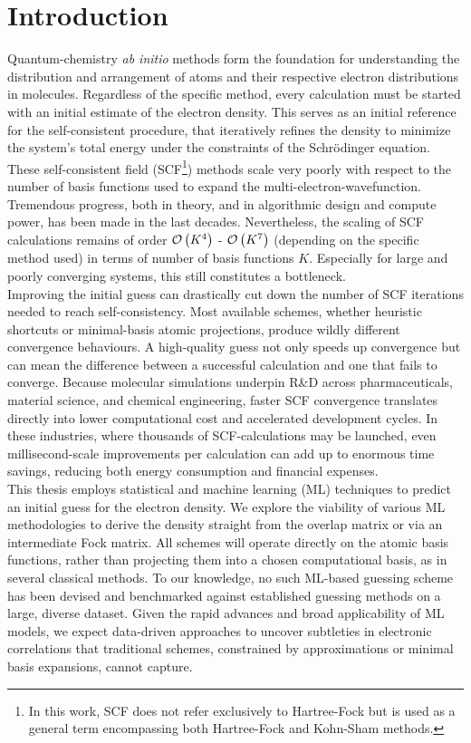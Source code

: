 \chapter{Introduction}
\label{sec:introduction}

Quantum-chemistry \textit{ab initio} methods form the foundation for understanding the distribution and arrangement of atoms and their respective electron distributions in molecules. Regardless of the specific method, every calculation must be started with an initial estimate of the electron density. This serves as an initial reference for the self-consistent procedure, that iteratively refines the density to minimize the system's total energy under the constraints of the Schrödinger equation. These self-consistent field (SCF\footnote{In this work, SCF does not refer exclusively to Hartree-Fock but is used as a general term encompassing both Hartree-Fock and Kohn-Sham methods.}) methods scale very poorly with respect to the number of basis functions used to expand the multi-electron-wavefunction. Tremendous progress, both in theory, and in algorithmic design and compute power, has been made in the last decades. Nevertheless, the scaling of SCF calculations remains of order $\mathcal{O}\left(K^4\right)$ - $\mathcal{O}\left(K^7\right)$ (depending on the specific method used) in terms of number of basis functions $K$. Especially for large and poorly converging systems, this still constitutes a bottleneck. \\

Improving the initial guess can drastically cut down the number of SCF iterations needed to reach self-consistency. Most available schemes, whether heuristic shortcuts or minimal-basis atomic projections, produce wildly different convergence behaviours. A high-quality guess not only speeds up convergence but can mean the difference between a successful calculation and one that fails to converge. Because molecular simulations underpin R\&D across pharmaceuticals, material science, and chemical engineering, faster SCF convergence translates directly into lower computational cost and accelerated development cycles. In these industries, where thousands of SCF-calculations may be launched, even millisecond-scale improvements per calculation can add up to enormous time savings, reducing both energy consumption and financial expenses. \\

This thesis employs statistical and machine learning (ML) techniques to predict an initial guess for the electron density. We explore the viability of various ML methodologies to derive the density straight from the overlap matrix or via an intermediate Fock matrix. All schemes will operate directly on the atomic basis functions, rather than projecting them into a chosen computational basis, as in several classical methods. To our knowledge, no such ML-based guessing scheme has been devised and benchmarked against established guessing methods on a large, diverse dataset. Given the rapid advances and broad applicability of ML models, we expect data-driven approaches to uncover subtleties in electronic correlations that traditional schemes, constrained by approximations or minimal basis expansions, cannot capture.\\

